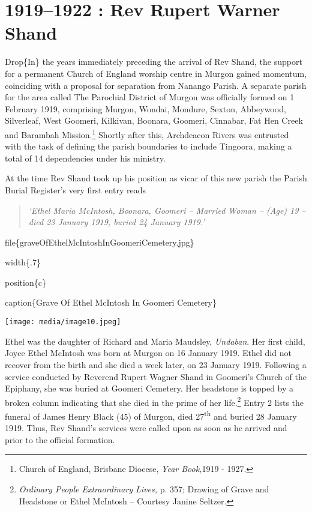 \hypertarget{rev-rupert-warner-shand}{%
\chapter{1919--1922 : Rev Rupert Warner Shand}\label{rev-rupert-warner-shand}}

Drop\{In\} the years immediately preceding the arrival of Rev Shand, the support for a permanent Church of England worship centre in Murgon gained momentum, coinciding with a proposal for separation from Nanango Parish. A separate parish for the area called The Parochial District of Murgon was officially formed on 1 February 1919, comprising Murgon, Wondai, Mondure, Sexton, Abbeywood, Silverleaf, West Goomeri, Kilkivan, Boonara, Goomeri, Cinnabar, Fat Hen Creek and Barambah Mission.\footnote{Church of England, Brisbane Diocese, \emph{Year Book,}1919 - 1927.} Shortly after this, Archdeacon Rivers was entrusted with the task of defining the parish boundaries to include Tingoora, making a total of 14 dependencies under his ministry.

At the time Rev Shand took up his position as vicar of this new parish the Parish Burial Register's very first entry reads

\begin{quote}
\emph{`Ethel Maria McIntosh, Boonara, Goomeri -- Married Woman -- (Age) 19 -- died 23 January 1919, buried 24 January 1919.'}
\end{quote}

file\{graveOfEthelMcIntoshInGoomeriCemetery.jpg\}

width\{.7\}

position\{c\}

caption\{Grave Of Ethel McIntosh In Goomeri Cemetery\}

\texttt{[image: media/image10.jpeg]}

Ethel was the daughter of Richard and Maria Maudsley, \emph{Undaban}. Her first child, Joyce Ethel McIntosh was born at Murgon on 16 January 1919. Ethel did not recover from the birth and she died a week later, on 23 January 1919. Following a service conducted by Reverend Rupert Wagner Shand in Goomeri's Church of the Epiphany, she was buried at Goomeri Cemetery. Her headstone is topped by a broken column indicating that she died in the prime of her life.\footnote{\emph{Ordinary People Extraordinary Lives,} p. 357; Drawing of Grave and Headstone or Ethel McIntosh -- Courtesy Janine Seltzer.} Entry 2 lists the funeral of James Henry Black (45) of Murgon, died 27\textsuperscript{th} and buried 28 January 1919. Thus, Rev Shand's services were called upon as soon as he arrived and prior to the official formation.

